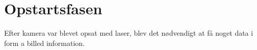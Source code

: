 \section{Opstartsfasen}

Efter kamera var blevet opsat med laser, blev det nødvendigt at få noget data i form a billed information.
